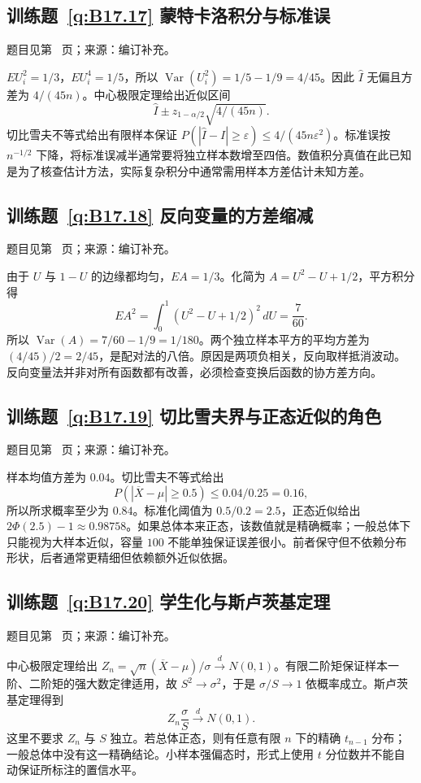 \subsection*{训练题~\ref{q:B17.17} 蒙特卡洛积分与标准误}\label{a:B17.17}{\small 题目见第~\pageref{q:B17.17} 页；来源：编订补充。}
\begin{solve}$EU_i^2=1/3$，$EU_i^4=1/5$，所以 $\operatorname{Var}(U_i^2)=1/5-1/9=4/45$。因此 $\widehat I$ 无偏且方差为 $4/(45n)$。中心极限定理给出近似区间\[\widehat I\pm z_{1-\alpha/2}\sqrt{4/(45n)}.\]切比雪夫不等式给出有限样本保证 $P(|\widehat I-I|\ge\varepsilon)\le4/(45n\varepsilon^2)$。标准误按 $n^{-1/2}$ 下降，将标准误减半通常要将独立样本数增至四倍。数值积分真值在此已知是为了核查估计方法，实际复杂积分中通常需用样本方差估计未知方差。\end{solve}

\subsection*{训练题~\ref{q:B17.18} 反向变量的方差缩减}\label{a:B17.18}{\small 题目见第~\pageref{q:B17.18} 页；来源：编订补充。}
\begin{solve}由于 $U$ 与 $1-U$ 的边缘都均匀，$EA=1/3$。化简为 $A=U^2-U+1/2$，平方积分得\[EA^2=\int_0^1(U^2-U+1/2)^2\,dU=\frac7{60}.\]所以 $\operatorname{Var}(A)=7/60-1/9=1/180$。两个独立样本平方的平均方差为 $(4/45)/2=2/45$，是配对法的八倍。原因是两项负相关，反向取样抵消波动。反向变量法并非对所有函数都有改善，必须检查变换后函数的协方差方向。\end{solve}

\subsection*{训练题~\ref{q:B17.19} 切比雪夫界与正态近似的角色}\label{a:B17.19}{\small 题目见第~\pageref{q:B17.19} 页；来源：编订补充。}
\begin{solve}样本均值方差为 $0.04$。切比雪夫不等式给出\[P(|\overline X-\mu|\ge0.5)\le0.04/0.25=0.16,\]所以所求概率至少为 $0.84$。标准化阈值为 $0.5/0.2=2.5$，正态近似给出 $2\Phi(2.5)-1\approx0.98758$。如果总体本来正态，该数值就是精确概率；一般总体下只能视为大样本近似，容量 $100$ 不能单独保证误差很小。前者保守但不依赖分布形状，后者通常更精细但依赖额外近似依据。\end{solve}

\subsection*{训练题~\ref{q:B17.20} 学生化与斯卢茨基定理}\label{a:B17.20}{\small 题目见第~\pageref{q:B17.20} 页；来源：编订补充。}
\begin{solve}中心极限定理给出 $Z_n=\sqrt n(\overline X-\mu)/\sigma\xrightarrow dN(0,1)$。有限二阶矩保证样本一阶、二阶矩的强大数定律适用，故 $S^2\to\sigma^2$，于是 $\sigma/S\to1$ 依概率成立。斯卢茨基定理得到\[Z_n\frac\sigma S\xrightarrow dN(0,1).\]这里不要求 $Z_n$ 与 $S$ 独立。若总体正态，则有任意有限 $n$ 下的精确 $t_{n-1}$ 分布；一般总体中没有这一精确结论。小样本强偏态时，形式上使用 $t$ 分位数并不能自动保证所标注的置信水平。\end{solve}

